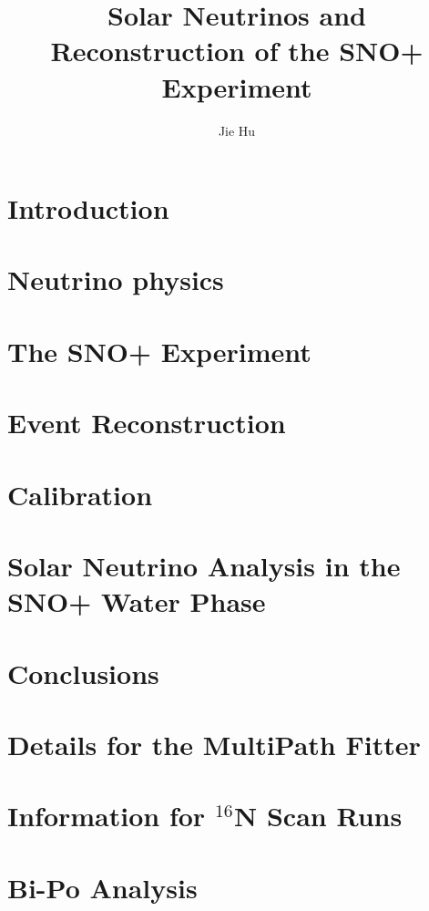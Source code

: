\documentclass[phd,black]{PrincetonThesis}
\title{Solar Neutrinos and Reconstruction of the SNO+ Experiment}
\author{Jie Hu}
\begin{document}
\begin{frontmatter}
  
\begin{thesisabstract}

\end{thesisabstract}
  
\begin{acknowledgements}

\end{acknowledgements}
  
\end{frontmatter}

\cleardoublepage
\chapter{Introduction}

\chapter{Neutrino physics}

\chapter{The SNO+ Experiment}

\chapter{Event Reconstruction}

\chapter{Calibration}

\chapter{Solar Neutrino Analysis in the SNO+ Water Phase}

\chapter{Conclusions}


\appendix
\cleardoublepage
\chapter{Details for the MultiPath Fitter}

\chapter{Information for $^{16}$N Scan Runs}

\chapter{Bi-Po Analysis}

%

\cleardoublepage
\nocite{*} %

\end{document}
